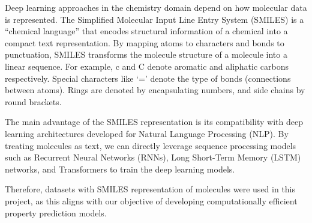 \documentclass[11pt,a4paper]{article}
\begin{document}
Deep learning approaches in the chemistry domain depend on how molecular data is represented. The Simplified Molecular Input Line Entry System (SMILES) is a ``chemical language'' \cite{weiningerSMILESChemicalLanguage1988} that encodes structural information of a chemical into a compact text representation. By mapping atoms to characters and bonds to punctuation, SMILES transforms the molecule structure of a molecule into a linear sequence. For example, c and C denote aromatic and aliphatic carbons respectively. Special characters like ‘=’ denote the type of bonds (connections between atoms). Rings are denoted by encapsulating numbers, and side chains by round brackets. 

The main advantage of the SMILES representation is its compatibility with deep learning architectures developed for Natural Language Processing (NLP). By treating molecules as text, we can directly leverage sequence processing models such as Recurrent Neural Networks (RNNs), Long Short-Term Memory (LSTM) networks, and Transformers to train the deep learning models.

Therefore, datasets with SMILES representation of molecules were used in this project, as this aligns with our objective of developing computationally efficient property prediction models.
\end{document}
